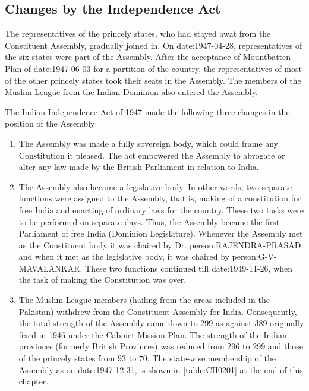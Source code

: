 \begin{multicols}{2}
\section{Changes by the Independence Act}

The representatives of the princely states, who had stayed awat from the Constituent Assembly, gradually joined in. On \gls{date:1947-04-28}, representatives of the six states were part of the Assembly. After the acceptance of Mountbatten Plan of \gls{date:1947-06-03} for a partition of the country, the representatives of most of the other princely states took their seats in the Assembly. The members of the Muslim League from the Indian Dominion also entered the Assembly.

The Indian Independence Act of 1947 made the following three changes in the position of the Assembly:

\begin{enumerate}
  \item The Assembly was made a fully sovereign body, which could frame any Constitution it pleased. The act empowered the Assembly to abrogate or alter any law made by the British Parliament in relation to India.
  \item The Assembly also became a legislative body. In other words, two separate functions were assigned to the Assembly, that is, making of a constitution for free India and enacting of ordinary laws for the country. These two tasks were to be performed on separate days. Thus, the Assembly became the first Parliament of free India (Dominion Legislature). Whenever the Assembly met as the Constituent body it was chaired by Dr. \gls{person:RAJENDRA-PRASAD} and when it met as the legislative body, it was chaired by \gls{person:G-V-MAVALANKAR}. These two functions continued till \gls{date:1949-11-26}, when the task of making the Constitution was over.
  \item The Muslim League members (hailing from the areas included in the Pakistan) withdrew from the Constituent Assembly for India. Consequently, the total strength of the Assembly came down to 299 as against 389 originally fixed in 1946 under the Cabinet Mission Plan. The strength of the Indian provinces (formerly British Provinces) was reduced from 296 to 299 and those of the princely states from 93 to 70. The state-wise membership of the Assembly as on \gls{date:1947-12-31}, is shown in \ref{table:CH0201} at the end of this chapter.
\end{enumerate}


\end{multicols}
